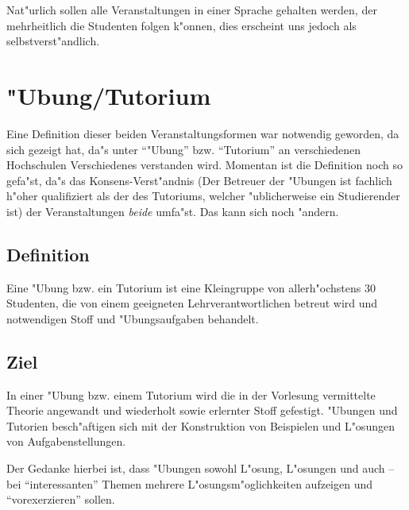 \begin{kcmt}\begin{komacmt}
Nat"urlich sollen alle Veranstaltungen in einer Sprache gehalten werden, der mehrheitlich
die Studenten folgen k"onnen, dies erscheint uns jedoch als selbstverst"andlich.
\end{komacmt}\end{kcmt}



\section{"Ubung/Tutorium}

\begin{kcmt}\begin{komacmt}
	Eine Definition dieser beiden Veranstaltungsformen war notwendig geworden, da sich
	gezeigt hat, da"s unter "`"Ubung"' bzw. "`Tutorium"' an verschiedenen Hochschulen
	Verschiedenes verstanden wird. Momentan ist die Definition noch so gefa"st, da"s
	das Konsens-Verst"andnis (Der Betreuer der "Ubungen ist fachlich h"oher qualifiziert
	als der des Tutoriums, welcher "ublicherweise ein Studierender ist) der Veranstaltungen
	\emph{beide} umfa"st. Das kann sich noch "andern.
\end{komacmt}\end{kcmt}

\subsection{Definition} 

	Eine "Ubung bzw. ein Tutorium ist eine Kleingruppe von allerh"ochstens 30 Studenten, die von einem geeigneten 
	Lehrverantwortlichen betreut wird und notwendigen Stoff und "Ubungsaufgaben behandelt.

\subsection{Ziel} 

	In einer "Ubung bzw. einem Tutorium wird die in der Vorlesung vermittelte Theorie angewandt und wiederholt
	sowie erlernter Stoff gefestigt. "Ubungen und Tutorien besch"aftigen sich mit der Konstruktion von Beispielen 
	und L"osungen von Aufgabenstellungen.

\begin{kcmt}\begin{komacmt}
Der Gedanke hierbei ist, dass "Ubungen sowohl L"osung, L"osungen und auch -- bei "`interessanten"'
Themen mehrere L"osungsm"oglichkeiten aufzeigen und "`vorexerzieren"' sollen.
\end{komacmt}\end{kcmt}

